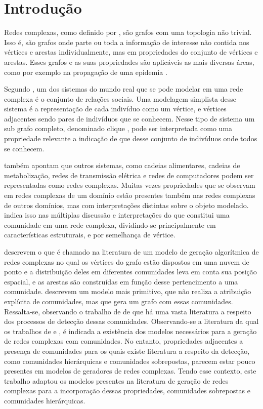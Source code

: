 \documentclass[notes.tex]{subfiles}
\begin{document}
\chapter{Introdução}

Redes complexas, como definido por , são grafos com uma topologia não trivial.
Isso é, são grafos onde parte ou toda a informação de interesse não contida nos vértices e arestas individualmente, mas em propriedades do conjunto de vértices e arestas.
Esses grafos e as suas propriedades são aplicáveis as mais diversas áreas, como por exemplo na propagação de uma epidemia .

Segundo , um dos sistemas do mundo real que se pode modelar em uma rede complexa é o conjunto de relações sociais.
Uma modelagem simplista desse sistema é a representação de cada indivíduo como um vértice, e vértices adjacentes sendo pares de indivíduos que se conhecem.
Nesse tipo de sistema um sub grafo completo, denominado clique \cite{fortunato2010community}, pode ser interpretada como uma propriedade relevante a indicação de que desse conjunto de indivíduos onde todos se conhecem.

 também apontam que outros sistemas, como cadeias alimentares, cadeias de metabolização, redes de transmissão elétrica e redes de computadores podem ser representadas como redes complexas.
Muitas vezes propriedades que se observam em redes complexas de um domínio estão presentes também nas redes complexas de outros domínios, mas com interpretações distintas sobre o objeto modelado.
 indica isso nas múltiplas discussão e interpretações do que constitui uma comunidade em uma rede complexa, dividindo-se principalmente em características estruturais, e por semelhança de vértice.

 descrevem o que é chamado na literatura de um modelo de geração algorítmica de redes complexas no qual os vértices do grafo estão dispostos em uma nuvem de ponto e a distribuição deles em diferentes comunidades leva em conta sua posição espacial, e as arestas são construídas em função desse pertencimento a uma comunidade.
 descrevem um modelo mais primitivo, que não realiza a atribuição explícita de comunidades, mas que gera um grafo com essas comunidades. 
Ressalta-se, observando o trabalho de  de que há uma vasta literatura a respeito dos processos de detecção dessas comunidades.
Observando-se a literatura da qual os trabalhos de  e , é indicada a existência dos modelos necessários para a geração de redes complexas com comunidades.
No entanto, propriedades adjacentes a presença de comunidades para os quais existe literatura a respeito da detecção, como comunidades hierárquicas e comunidades sobrepostas, parecem estar pouco presentes em modelos de geradores de redes complexas.
Tendo esse contexto, este trabalho adaptou os modelos presentes na literatura de geração de redes complexas para a incorporação dessas propriedades, comunidades sobrepostas e comunidades hierárquicas.
\end{document}

